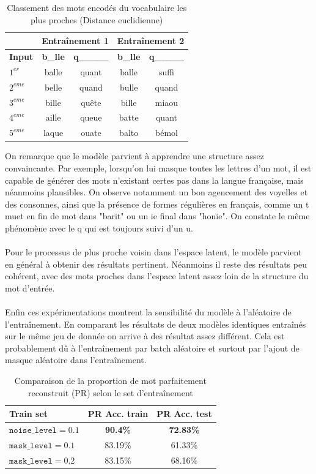 \documentclass{article}
\begin{document}
\begin{table}[H]
\centering
\begin{tabular}{l|cccc}
\hline
 & \multicolumn{2}{c}{\textbf{Entraînement 1}} & \multicolumn{2}{c}{\textbf{Entraînement 2}}\\
\hline
\textbf{Input} & \textbf{b\_lle} & \textbf{q\_\_\_\_} & \textbf{b\_lle} & \textbf{q\_\_\_\_}  \\
\hline
$1^{er}$ & balle & quant & balle & suffi \\
$2^{eme}$ & belle & quand & bulle & quand \\
$3^{eme}$ & bille & quête & bille & miaou \\
$4^{eme}$ & aille & queue & batte & quant \\
$5^{eme}$ & laque & ouate & balto & bémol \\
\hline
\end{tabular}
\caption{Classement des mots encodés du vocabulaire les plus proches (Distance euclidienne)}
\end{table}

On remarque que le modèle parvient à apprendre une structure assez convaincante. Par exemple, lorsqu’on lui masque toutes les lettres d’un mot, il est capable de générer des mots n’existant certes pas dans la langue française, mais néanmoins plausibles. On observe notamment un bon agencement des voyelles et des consonnes, ainsi que la présence de formes régulières en français, comme un t muet en fin de mot dans "barit" ou un ie final dans "honie". On constate le même phénomène avec le q qui est toujours suivi d'un u.
\\ \\
Pour le processus de plus proche voisin dans l'espace latent, le modèle parvient en général à obtenir des résultats pertinent. Néanmoins il reste des résultats peu cohérent, avec des mots proches dans l'espace latent assez loin de la structure du mot d'entrée.
\\ \\
Enfin ces expérimentations montrent la sensibilité du modèle à l'aléatoire de l'entraînement. En comparant les résultats de deux modèles identiques entraînés sur le même jeu de donnée on arrive à des résultat assez différent. Cela est probablement dû à l'entraînement par batch aléatoire et surtout par l'ajout de masque aléatoire dans l'entraînement.

\begin{table}[H]
\centering
\begin{tabular}{lcc}
\hline
\textbf{Train set} & \textbf{PR Acc. train} & \textbf{PR Acc. test}  \\
\hline
$\texttt{noise\_level} = 0.1$ & \textbf{90.4\%} & \textbf{72.83\%} \\
$\texttt{mask\_level} = 0.1$& 83.19\% & 61.33\%  \\
$\texttt{mask\_level} = 0.2$& 83.15\% & 68.16\%  \\
\hline
\end{tabular}
\caption{Comparaison de la proportion de mot parfaitement reconstruit (PR) selon le set d'entraînement}
\end{table}
\end{document}
